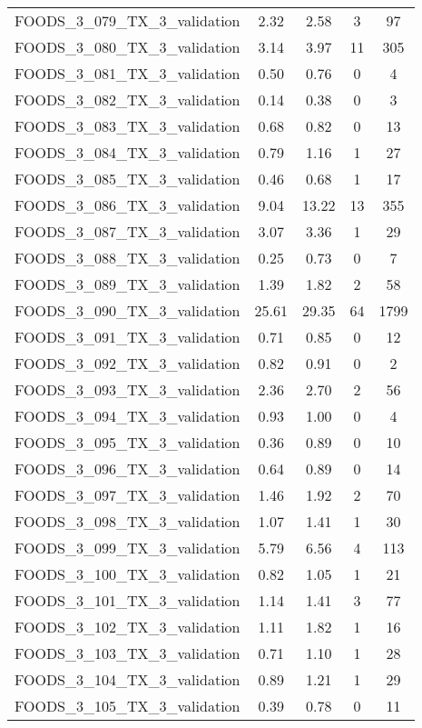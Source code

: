 \begin{table}
\begin{tabular}{|l|c|c|c|c|}
FOODS\_3\_079\_TX\_3\_validation & 2.32 & 2.58 & 3 & 97 \\
FOODS\_3\_080\_TX\_3\_validation & 3.14 & 3.97 & 11 & 305 \\
FOODS\_3\_081\_TX\_3\_validation & 0.50 & 0.76 & 0 & 4 \\
FOODS\_3\_082\_TX\_3\_validation & 0.14 & 0.38 & 0 & 3 \\
FOODS\_3\_083\_TX\_3\_validation & 0.68 & 0.82 & 0 & 13 \\
FOODS\_3\_084\_TX\_3\_validation & 0.79 & 1.16 & 1 & 27 \\
FOODS\_3\_085\_TX\_3\_validation & 0.46 & 0.68 & 1 & 17 \\
FOODS\_3\_086\_TX\_3\_validation & 9.04 & 13.22 & 13 & 355 \\
FOODS\_3\_087\_TX\_3\_validation & 3.07 & 3.36 & 1 & 29 \\
FOODS\_3\_088\_TX\_3\_validation & 0.25 & 0.73 & 0 & 7 \\
FOODS\_3\_089\_TX\_3\_validation & 1.39 & 1.82 & 2 & 58 \\
FOODS\_3\_090\_TX\_3\_validation & 25.61 & 29.35 & 64 & 1799 \\
FOODS\_3\_091\_TX\_3\_validation & 0.71 & 0.85 & 0 & 12 \\
FOODS\_3\_092\_TX\_3\_validation & 0.82 & 0.91 & 0 & 2 \\
FOODS\_3\_093\_TX\_3\_validation & 2.36 & 2.70 & 2 & 56 \\
FOODS\_3\_094\_TX\_3\_validation & 0.93 & 1.00 & 0 & 4 \\
FOODS\_3\_095\_TX\_3\_validation & 0.36 & 0.89 & 0 & 10 \\
FOODS\_3\_096\_TX\_3\_validation & 0.64 & 0.89 & 0 & 14 \\
FOODS\_3\_097\_TX\_3\_validation & 1.46 & 1.92 & 2 & 70 \\
FOODS\_3\_098\_TX\_3\_validation & 1.07 & 1.41 & 1 & 30 \\
FOODS\_3\_099\_TX\_3\_validation & 5.79 & 6.56 & 4 & 113 \\
FOODS\_3\_100\_TX\_3\_validation & 0.82 & 1.05 & 1 & 21 \\
FOODS\_3\_101\_TX\_3\_validation & 1.14 & 1.41 & 3 & 77 \\
FOODS\_3\_102\_TX\_3\_validation & 1.11 & 1.82 & 1 & 16 \\
FOODS\_3\_103\_TX\_3\_validation & 0.71 & 1.10 & 1 & 28 \\
FOODS\_3\_104\_TX\_3\_validation & 0.89 & 1.21 & 1 & 29 \\
FOODS\_3\_105\_TX\_3\_validation & 0.39 & 0.78 & 0 & 11 \\

\end{tabular}
\end{table}
